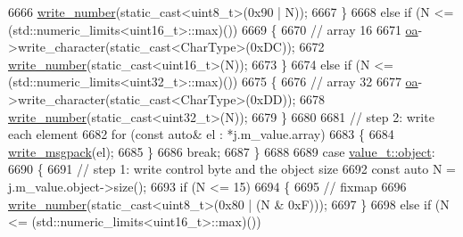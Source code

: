 \begin{DoxyCode}
6666                     \hyperlink{classnlohmann_1_1detail_1_1binary__writer_a62cfd50a511371e718f37ad7bb29ae9d}{write\_number}(static\_cast<uint8\_t>(0x90 | N));
6667                 \}
6668                 \textcolor{keywordflow}{else} \textcolor{keywordflow}{if} (N <= (std::numeric\_limits<uint16\_t>::max)())
6669                 \{
6670                     \textcolor{comment}{// array 16}
6671                     \hyperlink{classnlohmann_1_1detail_1_1binary__writer_a6f15b782a7900f50ef37d123008e601b}{oa}->write\_character(static\_cast<CharType>(0xDC));
6672                     \hyperlink{classnlohmann_1_1detail_1_1binary__writer_a62cfd50a511371e718f37ad7bb29ae9d}{write\_number}(static\_cast<uint16\_t>(N));
6673                 \}
6674                 \textcolor{keywordflow}{else} \textcolor{keywordflow}{if} (N <= (std::numeric\_limits<uint32\_t>::max)())
6675                 \{
6676                     \textcolor{comment}{// array 32}
6677                     \hyperlink{classnlohmann_1_1detail_1_1binary__writer_a6f15b782a7900f50ef37d123008e601b}{oa}->write\_character(static\_cast<CharType>(0xDD));
6678                     \hyperlink{classnlohmann_1_1detail_1_1binary__writer_a62cfd50a511371e718f37ad7bb29ae9d}{write\_number}(static\_cast<uint32\_t>(N));
6679                 \}
6680 
6681                 \textcolor{comment}{// step 2: write each element}
6682                 \textcolor{keywordflow}{for} (\textcolor{keyword}{const} \textcolor{keyword}{auto}& el : *j.m\_value.array)
6683                 \{
6684                     \hyperlink{classnlohmann_1_1detail_1_1binary__writer_ae4e0852b64102ce4b07d99f08f828b7c}{write\_msgpack}(el);
6685                 \}
6686                 \textcolor{keywordflow}{break};
6687             \}
6688 
6689             \textcolor{keywordflow}{case} \hyperlink{namespacenlohmann_1_1detail_a1ed8fc6239da25abcaf681d30ace4985aa8cfde6331bd59eb2ac96f8911c4b666}{value\_t::object}:
6690             \{
6691                 \textcolor{comment}{// step 1: write control byte and the object size}
6692                 \textcolor{keyword}{const} \textcolor{keyword}{auto} N = j.m\_value.object->size();
6693                 \textcolor{keywordflow}{if} (N <= 15)
6694                 \{
6695                     \textcolor{comment}{// fixmap}
6696                     \hyperlink{classnlohmann_1_1detail_1_1binary__writer_a62cfd50a511371e718f37ad7bb29ae9d}{write\_number}(static\_cast<uint8\_t>(0x80 | (N & 0xF)));
6697                 \}
6698                 \textcolor{keywordflow}{else} \textcolor{keywordflow}{if} (N <= (std::numeric\_limits<uint16\_t>::max)())

\end{DoxyCode}
